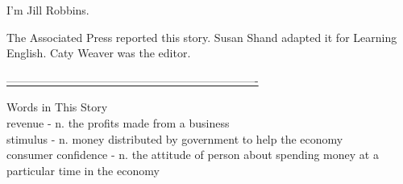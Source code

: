 I'm Jill Robbins.

The Associated Press reported this story. Susan Shand adapted it for Learning English. Caty Weaver was the editor.


\underline{-------------------------------------------------------------------}

Words in This Story \\
revenue - n. the profits made from a business \\

stimulus - n. money distributed by government to help the economy \\

consumer confidence - n. the attitude of person about spending money at a particular time in the economy \newline





